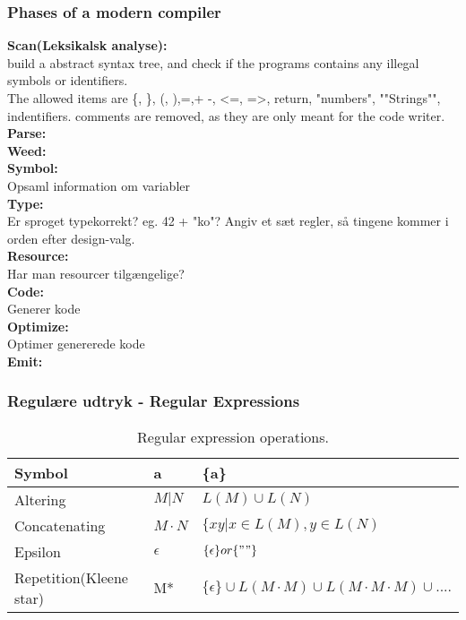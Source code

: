 \documentclass[a4paper,10pt,titlepage]{report}
\begin{document}
\subsubsection{Phases of a modern compiler}
\textbf{Scan(Leksikalsk analyse):}\\
build a abstract syntax tree, and check if the programs contains any illegal symbols or identifiers.\\
The allowed items are \{, \}, (, ),=,+ -, <=, =>, return, "numbers", ""Strings"", indentifiers. comments are removed, as they are only meant for the code writer. \\
\vspace{6px}
\textbf{Parse:}\\
\vspace{6px}
\textbf{Weed:}\\
\vspace{6px}
\textbf{Symbol:}\\
Opsaml information om variabler\\
\vspace{6px}
\textbf{Type:}\\
Er sproget typekorrekt? eg. 42 + "ko"? Angiv et sæt regler, så tingene kommer i orden efter design-valg.\\
\vspace{6px}
\textbf{Resource:}\\
Har man resourcer tilgængelige?\\
\vspace{6px}
\textbf{Code:}\\
Generer kode \\
\vspace{6px}
\textbf{Optimize:}\\
Optimer genererede kode\\
\vspace{6px}
\textbf{Emit:}\\

\subsubsection{Regulære udtryk - Regular Expressions}
\begin{table}[H]
\caption{Regular expression operations.}
\begin{tabular}{l|l|l}
Symbol        & a         & \{a\}                           \\
\hline
Altering      & $M|N$       & $L(M) \cup L(N)$                  \\
\hline
Concatenating &$ M \cdot N$ &$ \{xy | x \in L(M), y \in L(N) $  \\
\hline
Epsilon      &$ \epsilon $   &$ \{\epsilon\} or \{""\} $        \\
\hline
Repetition(Kleene star)      & M*    &$ \{\epsilon \} \cup L(M \cdot M) \cup L(M\cdot M\cdot M) \cup ....$         \\
\end{tabular}
\end{table}
\end{document}
